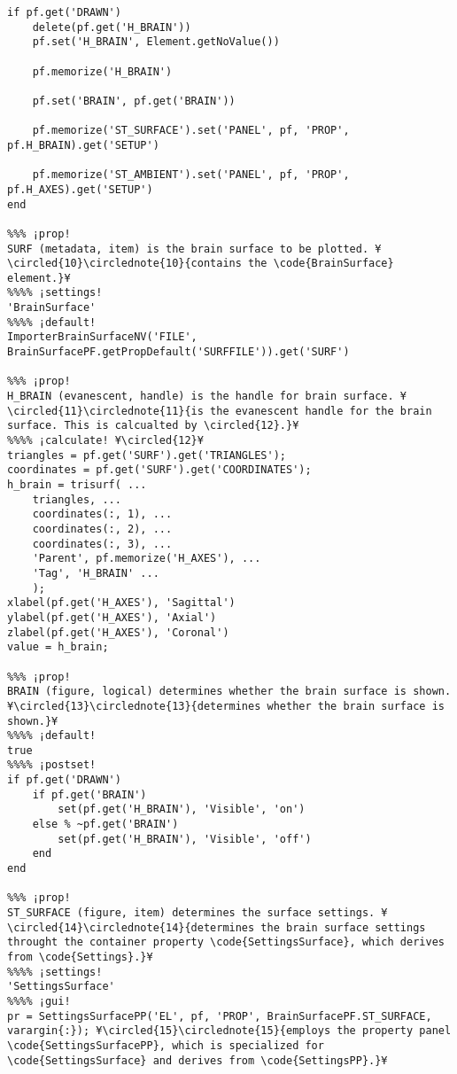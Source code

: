 \documentclass{tufte-handout}
\begin{document}
\begin{lstlisting}
if pf.get('DRAWN')
    delete(pf.get('H_BRAIN'))
    pf.set('H_BRAIN', Element.getNoValue())

    pf.memorize('H_BRAIN')

    pf.set('BRAIN', pf.get('BRAIN'))

    pf.memorize('ST_SURFACE').set('PANEL', pf, 'PROP', pf.H_BRAIN).get('SETUP')

    pf.memorize('ST_AMBIENT').set('PANEL', pf, 'PROP', pf.H_AXES).get('SETUP')
end

%%% ¡prop!
SURF (metadata, item) is the brain surface to be plotted. ¥\circled{10}\circlednote{10}{contains the \code{BrainSurface} element.}¥
%%%% ¡settings!
'BrainSurface'
%%%% ¡default!
ImporterBrainSurfaceNV('FILE', BrainSurfacePF.getPropDefault('SURFFILE')).get('SURF')

%%% ¡prop!
H_BRAIN (evanescent, handle) is the handle for brain surface. ¥\circled{11}\circlednote{11}{is the evanescent handle for the brain surface. This is calcualted by \circled{12}.}¥
%%%% ¡calculate! ¥\circled{12}¥
triangles = pf.get('SURF').get('TRIANGLES');
coordinates = pf.get('SURF').get('COORDINATES');
h_brain = trisurf( ...
    triangles, ...
    coordinates(:, 1), ...
    coordinates(:, 2), ...
    coordinates(:, 3), ...
    'Parent', pf.memorize('H_AXES'), ...
    'Tag', 'H_BRAIN' ...
    );
xlabel(pf.get('H_AXES'), 'Sagittal')
ylabel(pf.get('H_AXES'), 'Axial')
zlabel(pf.get('H_AXES'), 'Coronal')
value = h_brain;

%%% ¡prop!
BRAIN (figure, logical) determines whether the brain surface is shown. ¥\circled{13}\circlednote{13}{determines whether the brain surface is shown.}¥
%%%% ¡default!
true
%%%% ¡postset!
if pf.get('DRAWN')
    if pf.get('BRAIN')
        set(pf.get('H_BRAIN'), 'Visible', 'on')
    else % ~pf.get('BRAIN') 
        set(pf.get('H_BRAIN'), 'Visible', 'off')
    end
end

%%% ¡prop!
ST_SURFACE (figure, item) determines the surface settings. ¥\circled{14}\circlednote{14}{determines the brain surface settings throught the container property \code{SettingsSurface}, which derives from \code{Settings}.}¥
%%%% ¡settings!
'SettingsSurface'
%%%% ¡gui!
pr = SettingsSurfacePP('EL', pf, 'PROP', BrainSurfacePF.ST_SURFACE, varargin{:}); ¥\circled{15}\circlednote{15}{employs the property panel \code{SettingsSurfacePP}, which is specialized for \code{SettingsSurface} and derives from \code{SettingsPP}.}¥


\end{lstlisting}
\end{document}
